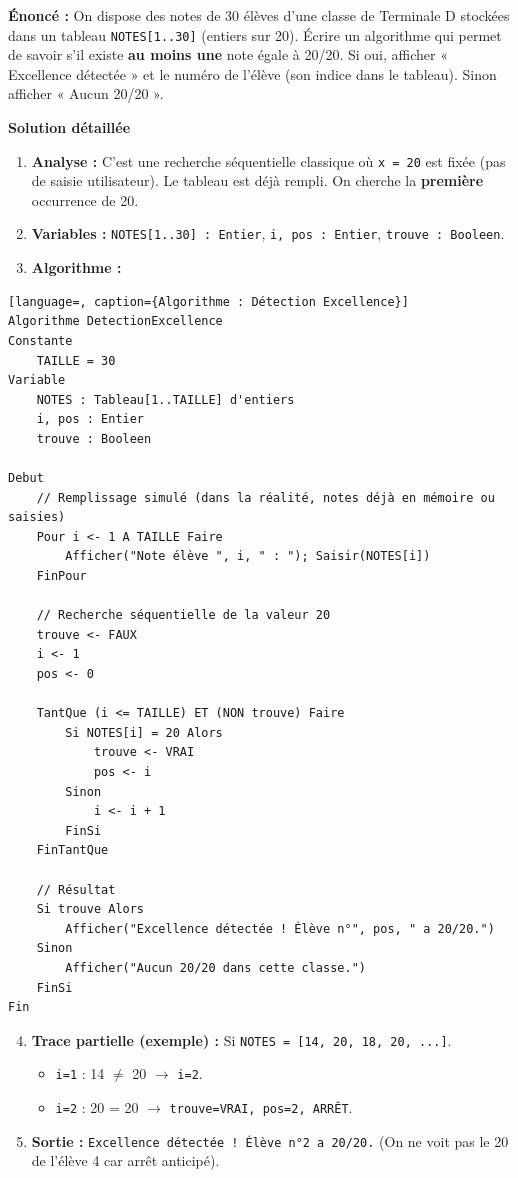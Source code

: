 \documentclass[11pt]{article}
\begin{document}
\begin{exoresolu}
\textbf{Énoncé :} On dispose des notes de 30 élèves d'une classe de Terminale D stockées dans un tableau \texttt{NOTES[1..30]} (entiers sur 20). Écrire un algorithme qui permet de savoir s'il existe \textbf{au moins une} note égale à 20/20. Si oui, afficher « Excellence détectée » et le numéro de l'élève (son indice dans le tableau). Sinon afficher « Aucun 20/20 ».

\tcblower

\textbf{Solution détaillée}

\begin{enumerate}
    \item \textbf{Analyse :} C'est une recherche séquentielle classique où \texttt{x = 20} est fixée (pas de saisie utilisateur). Le tableau est déjà rempli. On cherche la \textbf{première} occurrence de 20.
    \item \textbf{Variables :} \texttt{NOTES[1..30] : Entier}, \texttt{i, pos : Entier}, \texttt{trouve : Booleen}.
    \item \textbf{Algorithme :}
\end{enumerate}

\begin{lstlisting}[language=, caption={Algorithme : Détection Excellence}]
Algorithme DetectionExcellence
Constante
    TAILLE = 30
Variable
    NOTES : Tableau[1..TAILLE] d'entiers
    i, pos : Entier
    trouve : Booleen

Debut
    // Remplissage simulé (dans la réalité, notes déjà en mémoire ou saisies)
    Pour i <- 1 A TAILLE Faire
        Afficher("Note élève ", i, " : "); Saisir(NOTES[i])
    FinPour

    // Recherche séquentielle de la valeur 20
    trouve <- FAUX
    i <- 1
    pos <- 0

    TantQue (i <= TAILLE) ET (NON trouve) Faire
        Si NOTES[i] = 20 Alors
            trouve <- VRAI
            pos <- i
        Sinon
            i <- i + 1
        FinSi
    FinTantQue

    // Résultat
    Si trouve Alors
        Afficher("Excellence détectée ! Élève n°", pos, " a 20/20.")
    Sinon
        Afficher("Aucun 20/20 dans cette classe.")
    FinSi
Fin
\end{lstlisting}

\begin{enumerate}\setcounter{enumi}{3}
    \item \textbf{Trace partielle (exemple) :} Si \texttt{NOTES = [14, 20, 18, 20, ...]}.
    \begin{itemize}
        \item \texttt{i=1} : 14 $\neq$ 20 $\rightarrow$ \texttt{i=2}.
        \item \texttt{i=2} : 20 = 20 $\rightarrow$ \texttt{trouve=VRAI, pos=2, ARRÊT}.
    \end{itemize}
    \item \textbf{Sortie :} \texttt{Excellence détectée ! Élève n°2 a 20/20.} (On ne voit pas le 20 de l'élève 4 car arrêt anticipé).
\end{enumerate}
\end{exoresolu}
\end{document}
